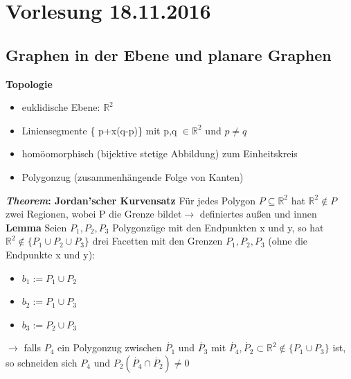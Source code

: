 \section{Vorlesung 18.11.2016}
\subsection{Graphen in der Ebene und planare Graphen}
\textbf{Topologie}
\begin{itemize}
	\item euklidische Ebene: $\mathbb{R}^2$ 
	\item Liniensegmente \{ p+x(q-p)\} mit p,q $\in \mathbb{R}^2$ und $p \neq q$
	\item homöomorphisch (bijektive stetige Abbildung) zum Einheitskreis
	\item Polygonzug (zusammenhängende Folge von Kanten)
\end{itemize}
\textbf{\textit{Theorem}: Jordan'scher Kurvensatz}\newline
Für jedes Polygon $P \subseteq \mathbb{R}^2$ hat $\mathbb{R}^2\notin P$ zwei Regionen, wobei P die Grenze bildet\newline $\rightarrow$ definiertes außen und innen \newline
\textbf{Lemma}\newline
Seien $P_1, P_2, P_3$ Polygonzüge mit den Endpunkten x und y, so hat $\mathbb{R}^2 \notin \{ P_1 \cup P_2 \cup P_3\}$ drei Facetten mit den Grenzen $P_1, P_2, P_3$ (ohne die Endpunkte x und y): 
\begin{itemize}
	\item{} $b_1 := P_1 \cup P_2$
	\item{} $b_2 := P_1 \cup P_3$
	\item{} $b_3 := P_2 \cup P_3$ 
\end{itemize}
$\rightarrow$ falls $P_4$ ein Polygonzug zwischen $\dot{P_1}$ und $\dot{P_3}$ mit $\dot{P_4}, \dot{P_2} \subset \mathbb{R}^2 \notin \{ P_1 \cup P_3\}$ ist, so schneiden sich $P_4$ und $P_2 (\dot{P_4} \cap \dot{P_2}) \neq 0$ \newline

